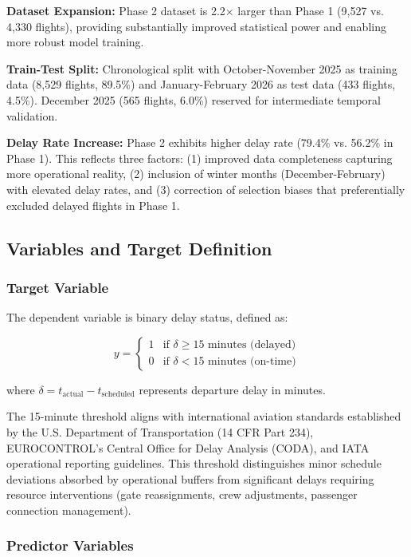 \documentclass{report}
\begin{document}
\textbf{Dataset Expansion:} Phase 2 dataset is 2.2× larger than Phase 1 (9,527 vs. 4,330 flights), providing substantially improved statistical power and enabling more robust model training.

\textbf{Train-Test Split:} Chronological split with October-November 2025 as training data (8,529 flights, 89.5\%) and January-February 2026 as test data (433 flights, 4.5\%). December 2025 (565 flights, 6.0\%) reserved for intermediate temporal validation.

\textbf{Delay Rate Increase:} Phase 2 exhibits higher delay rate (79.4\% vs. 56.2\% in Phase 1). This reflects three factors: (1) improved data completeness capturing more operational reality, (2) inclusion of winter months (December-February) with elevated delay rates, and (3) correction of selection biases that preferentially excluded delayed flights in Phase 1.

\subsection{Variables and Target Definition}
\label{sec:variables_target}

\subsubsection{Target Variable}

The dependent variable is binary delay status, defined as:

\begin{equation}
y = \begin{cases} 
1 & \text{if } \delta \geq 15 \text{ minutes (delayed)} \\
0 & \text{if } \delta < 15 \text{ minutes (on-time)}
\end{cases}
\end{equation}

where $\delta = t_{\text{actual}} - t_{\text{scheduled}}$ represents departure delay in minutes.

The 15-minute threshold aligns with international aviation standards established by the U.S. Department of Transportation (14 CFR Part 234), EUROCONTROL's Central Office for Delay Analysis (CODA), and IATA operational reporting guidelines. This threshold distinguishes minor schedule deviations absorbed by operational buffers from significant delays requiring resource interventions (gate reassignments, crew adjustments, passenger connection management).

\subsubsection{Predictor Variables}
\end{document}
